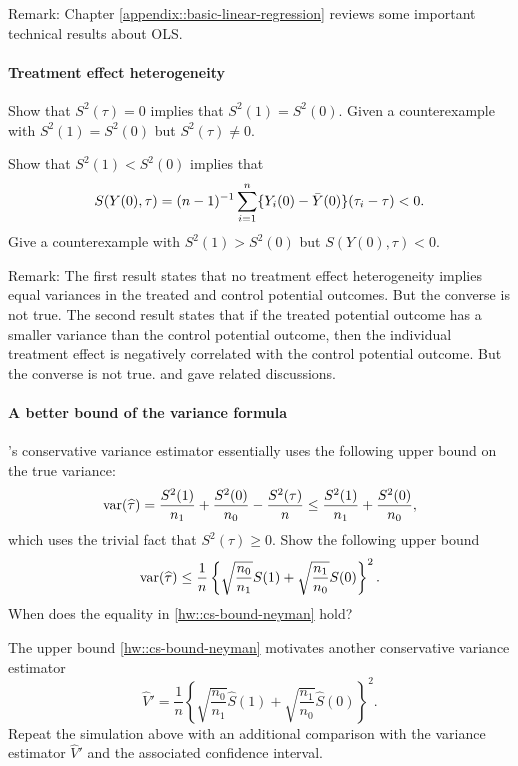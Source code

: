 Remark: Chapter \ref{appendix::basic-linear-regression} reviews some important technical results about OLS.





\paragraph{Treatment effect heterogeneity}\label{hw::treatment-effect-heterogeneity-neyman}


Show that $S^2(\tau) = 0$ implies that $S^2(1) = S^2(0)$. Given a counterexample with $S^2(1) = S^2(0)$ but $S^2(\tau) \neq  0$.


Show that $S^2(1) < S^2(0)$ implies that
$$
S(Y(0),\tau)  = (n-1)^{-1} \sum_{i=1}^n \{ Y_i(0)  - \bar{Y}(0) \} (\tau_i - \tau) <0.
$$
Give a counterexample with $S^2(1) > S^2(0)$ but $S(Y(0),\tau)  < 0 .$



Remark: The first result states that no treatment effect heterogeneity implies equal variances in the treated and control potential outcomes. But the converse is not true. The second result states that if the treated potential outcome has a smaller variance than the control potential outcome, then the individual treatment effect is negatively correlated with the control potential outcome. But the converse is not true. \citet[][page 293]{gerber2012field} and \citet[][Appendix B.3]{ding2019decomposing} gave related discussions.



\paragraph{A better bound of the variance formula}
\label{hw::better-bound-neyman}


\cite{Neyman:1923}'s conservative variance estimator essentially uses the following upper bound on the true variance:
$$
\textup{var}(\widehat{\tau}) = \frac{S^2(1)}{n_1} + \frac{S^2(0)}{n_0} - \frac{S^2(\tau)}{n} \leq \frac{S^2(1)}{n_1} + \frac{S^2(0)}{n_0},
$$
which uses the trivial fact that $S^2(\tau) \geq 0$.
Show the following upper bound
\begin{eqnarray}\label{hw::cs-bound-neyman}
\textup{var}(\widehat{\tau})  \leq   \frac{1}{n} \left\{   \sqrt{  \frac{n_0}{n_1}  } S(1) +  \sqrt{  \frac{n_1}{n_0}  } S(0)   \right\}^2.
\end{eqnarray}
When does the equality in \eqref{hw::cs-bound-neyman} hold?

The upper bound \eqref{hw::cs-bound-neyman} motivates another conservative variance estimator
$$
\hat{V}' =  \frac{1}{n} \left\{   \sqrt{  \frac{n_0}{n_1}  } \hat S(1) +  \sqrt{  \frac{n_1}{n_0}  } \hat S(0)   \right\}^2.
$$
Repeat the simulation above with an additional comparison with the variance estimator $\hat{V}' $ and the associated confidence interval.



